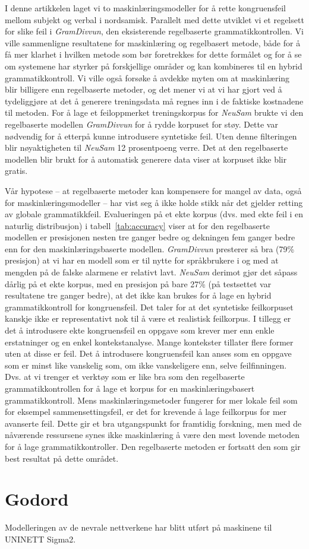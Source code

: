 \documentclass{flammie}
\begin{document}
I denne artikkelen laget vi to maskinlæringsmodeller for å rette kongruensfeil
mellom subjekt og verbal i nordsamisk. Parallelt med dette utviklet vi et
regelsett for slike feil i \textit{GramDivvun}, den eksisterende regelbaserte
grammatikkontrollen.  Vi ville sammenligne resultatene for maskinlæring og
regelbasert metode, både for å få mer klarhet i hvilken metode som bør
foretrekkes for dette formålet og for å se om systemene har styrker på
forskjellige områder og kan kombineres til en hybrid grammatikkontroll.  Vi
ville også forsøke å avdekke myten om at maskinlæring blir billigere enn
regelbaserte metoder, og det mener vi at vi har gjort ved å tydeliggjøre at det
å generere treningsdata må regnes inn i de faktiske kostnadene til metoden.  For
å lage et feiloppmerket treningskorpus for \textit{NeuSam} brukte vi den
regelbaserte modellen \textit{GramDivvun} for å rydde korpuset for støy. Dette
var nødvendig for å etterpå kunne introdusere syntetiske feil.  Uten denne
filteringen blir nøyaktigheten til \textit{NeuSam} 12 prosentpoeng verre.  Det
at den regelbaserte modellen blir brukt for å automatisk generere data viser at
korpuset ikke blir gratis.

Vår hypotese -- at regelbaserte metoder kan kompensere for mangel av data, også
for maskinlæringsmodeller -- har vist seg å ikke holde stikk når det gjelder
retting av globale grammatikkfeil.  Evalueringen på et ekte korpus (dvs. med
ekte feil i en naturlig distribusjon) i tabell~\ref{tab:accuracy} viser at for
den regelbaserte modellen er presisjonen nesten tre ganger bedre og dekningen
fem ganger bedre enn for den maskinlæringsbaserte modellen. \textit{GramDivvun}
presterer så bra (79\% presisjon) at vi har en modell som er til nytte for
språkbrukere i og med at mengden på de falske alarmene er relativt lavt.
\textit{NeuSam} derimot gjør det såpass dårlig på et ekte korpus, med en
presisjon på bare 27\% (på testsettet var resultatene tre ganger bedre), at det
ikke kan brukes for å lage en hybrid grammatikkontroll for kongruensfeil.  Det
taler for at det syntetiske feilkorpuset kanskje ikke er representativt nok til
å være et realistisk feilkorpus. I tillegg er det å introdusere ekte
kongruensfeil en oppgave som krever mer enn enkle erstatninger og en enkel
kontekstanalyse. Mange kontekster tillater flere former uten at disse er feil.
Det å introdusere kongruensfeil kan anses som en oppgave som er minst like
vanskelig som, om ikke vanskeligere enn, selve feilfinningen. Dvs. at vi trenger
et verktøy som er like bra som den regelbaserte grammatikkontrollen for å lage
et korpus for en maskinlæringsbasert grammatikkontroll.  Mens
maskinlæringsmetoder fungerer for mer lokale feil som for eksempel
sammensettingsfeil, er det for krevende å lage feilkorpus for mer avanserte
feil.  Dette gir et bra utgangspunkt for framtidig forskning, men med de
nåværende ressursene synes ikke maskinlæring å være den mest lovende metoden for
å lage grammatikkontroller. Den regelbaserte metoden er fortsatt den som gir
best resultat på dette området.

\section*{Godord}

Modelleringen av de nevrale nettverkene har blitt utført på maskinene til
UNINETT Sigma2.







\label{lastpage}
\end{document}
